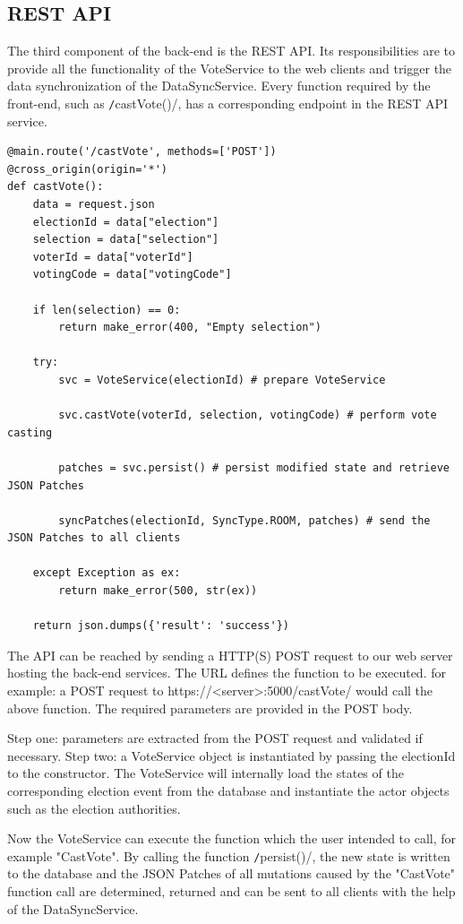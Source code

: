 \subsection{REST API}
The third component of the back-end is the REST API. Its responsibilities are to provide all the functionality of the VoteService to the web clients and trigger the data synchronization of the DataSyncService. Every function required by the front-end, such as \texttt/castVote()/, has a corresponding endpoint in the REST API service.

\begin{verbatim}
@main.route('/castVote', methods=['POST'])
@cross_origin(origin='*')
def castVote():
    data = request.json
    electionId = data["election"]
    selection = data["selection"]
    voterId = data["voterId"]
    votingCode = data["votingCode"]

    if len(selection) == 0:
        return make_error(400, "Empty selection")

    try:
        svc = VoteService(electionId) # prepare VoteService

        svc.castVote(voterId, selection, votingCode) # perform vote casting

        patches = svc.persist()	# persist modified state and retrieve JSON Patches

        syncPatches(electionId, SyncType.ROOM, patches)	# send the JSON Patches to all clients

    except Exception as ex:
        return make_error(500, str(ex))

    return json.dumps({'result': 'success'})
\end{verbatim}

The API can be reached by sending a HTTP(S) POST request to our web server hosting the back-end services. The URL defines the function to be executed. for example: a POST request to https://<server>:5000/castVote/ would call the above function. The required parameters are provided in the POST body.

Step one: parameters are extracted from the POST request and validated if necessary. Step two: a VoteService object is instantiated by passing the electionId to the constructor. The VoteService will internally load the states of the corresponding election event from the database and instantiate the actor objects such as the election authorities.

Now the VoteService can execute the function which the user intended to call, for example "{}CastVote"{}. By calling the function \texttt/persist()/, the new state is written to the database and the JSON Patches of all mutations caused by the "{}CastVote"{} function call are determined, returned and can be sent to all clients with the help of the DataSyncService.

